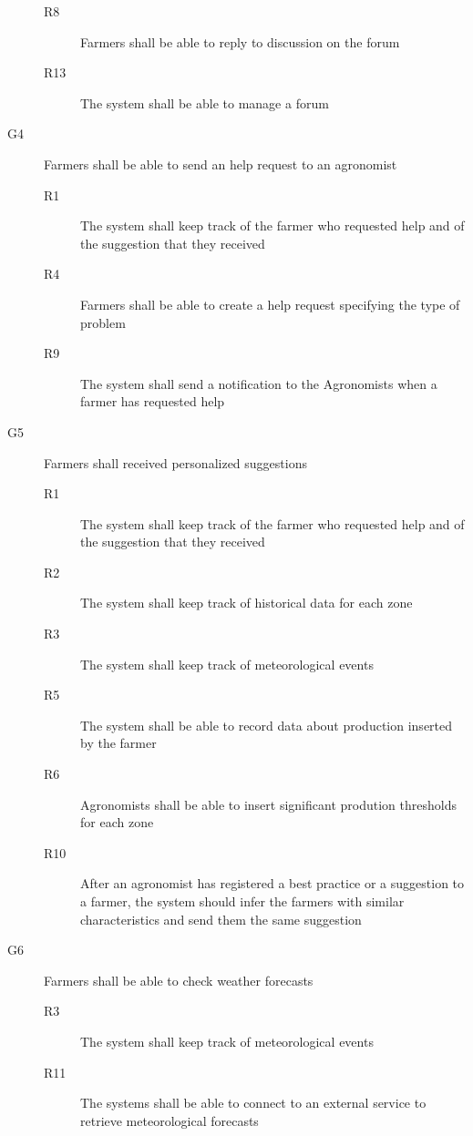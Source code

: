 \begin{description}
\begin{description}
            \item[R8] Farmers shall be able to reply to discussion on the forum
            \item[R13] The system shall be able to manage a forum
        \end{description}
    \item [G4] Farmers shall be able to send an help request to an agronomist
        \begin{description}
            \item[R1] The system shall keep track of the farmer who requested help and of the suggestion that they received
            \item[R4] Farmers shall be able to create a help request specifying  the type of problem
            \item[R9] The system shall send a notification to the Agronomists when a farmer has requested help
        \end{description}
    \item [G5] Farmers shall received personalized suggestions
        \begin{description}
            \item[R1] The system shall keep track of the farmer who requested help and of the suggestion that they received
            \item[R2] The system shall keep track of historical data for each zone
            \item[R3] The system shall keep track of meteorological events
            \item[R5] The system shall be able to record data about production inserted by the farmer
            \item[R6] Agronomists shall be able to insert significant prodution thresholds for each zone
            \item[R10] After an agronomist has registered a best practice or a suggestion to a farmer, the system should infer the farmers with similar characteristics and send them the same suggestion 
        \end{description}
    \item [G6] Farmers shall be able to check weather forecasts
        \begin{description}
            \item[R3] The system shall keep track of meteorological events
            \item[R11] The systems shall be able to connect to an external service to retrieve meteorological forecasts

\end{description}
\end{description}
